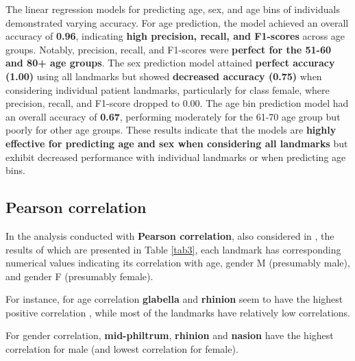 \documentclass[journal,article,submit,pdftex,moreauthors]{Definitions/mdpi}
\begin{document}
The linear regression models for predicting age, sex, and age bins of individuals demonstrated varying accuracy. For age prediction, the model achieved an overall accuracy of \textbf{0.96}, indicating \textbf{high precision, recall, and F1-scores} across age groups. Notably, precision, recall, and F1-scores were \textbf{perfect for the 51-60 and 80+ age groups}. The sex prediction model attained \textbf{perfect accuracy (1.00)} using all landmarks but showed \textbf{decreased accuracy (0.75)} when considering individual patient landmarks, particularly for class female, where precision, recall, and F1-score dropped to 0.00. The age bin prediction model had an overall accuracy of \textbf{0.67}, performing moderately for the 61-70 age group but poorly for other age groups. These results indicate that the models are \textbf{highly effective for predicting age and sex when considering all landmarks} but exhibit decreased performance with individual landmarks or when predicting age bins.

\subsection*{Pearson correlation} \label{subsec:pearson-correlation}
In the analysis conducted with \textbf{Pearson correlation}, also considered in \cite{ref19}, the results of which are presented in Table \ref{tab3}, each landmark has corresponding numerical values indicating its correlation with age, gender M (presumably male), and gender F (presumably female). 

For instance, for age correlation \textbf{glabella} and \textbf{rhinion} seem to have the highest positive correlation , while most of the landmarks have relatively low correlations.

For gender correlation, \textbf{mid-philtrum}, \textbf{rhinion} and \textbf{nasion} have the highest correlation for male (and lowest correlation for female).
\end{document}
